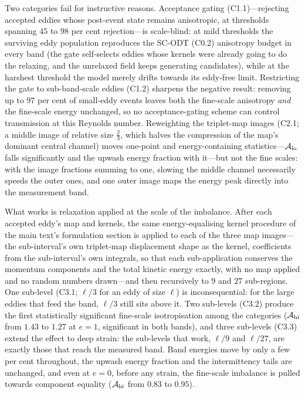\documentclass{JFM-FLM_Au}
\begin{document}
Two categories fail for instructive reasons. Acceptance gating
(C1.1)---rejecting accepted eddies whose post-event state remains
anisotropic, at thresholds spanning $45$ to $98$ per cent
rejection---is scale-blind: at mild thresholds the surviving eddy
population reproduces the SC-ODT (C0.2) anisotropy budget in every
band (the gate self-selects eddies whose kernels were already going to
do the relaxing, and the unrelaxed field keeps generating candidates),
while at the harshest threshold the model merely drifts towards its
eddy-free limit. Restricting the gate to sub-band-scale eddies (C1.2)
sharpens the negative result: removing up to $97$ per cent of
small-eddy events leaves both the fine-scale anisotropy \emph{and} the
fine-scale energy unchanged, so no acceptance-gating scheme can
control transmission at this Reynolds number. Reweighting the
triplet-map images (C2.1; a middle image of relative size $\tfrac23$,
which halves the compression of the map's dominant central channel)
moves one-point and energy-containing
statistics---$\mathcal A_{\rm lo}$ falls significantly and the upwash
energy fraction with it---but not the fine scales: with the image
fractions summing to one, slowing the middle channel necessarily
speeds the outer ones, and one outer image maps the energy peak
directly into the measurement band.

What works is relaxation applied at the scale of the imbalance. After
each accepted eddy's map and kernels, the same energy-equalising
kernel procedure of the main text's formulation section is applied to
each of the three map images---the sub-interval's own triplet-map
displacement shape as the kernel, coefficients from the sub-interval's
own integrals, so that each sub-application conserves the momentum
components and the total kinetic energy exactly, with no map applied
and no random numbers drawn---and then recursively to $9$ and $27$
sub-regions. One sub-level (C3.1; $\ell/3$ for an eddy of size $\ell$)
is inconsequential: for the large eddies that feed the band, $\ell/3$
still sits above it. Two sub-levels (C3.2) produce the first
statistically significant fine-scale isotropisation among the
categories ($\mathcal A_{\rm hi}$ from $1.43$ to $1.27$ at $e=1$,
significant in both bands), and three sub-levels (C3.3) extend the
effect to deep strain: the sub-levels that work, $\ell/9$ and
$\ell/27$, are exactly those that reach the measured band. Band
energies move by only a few per cent throughout, the upwash energy
fraction and the intermittency tails are unchanged, and even at $e=0$,
before any strain, the fine-scale imbalance is pulled towards
component equality ($\mathcal A_{\rm hi}$ from $0.83$ to $0.95$).
\end{document}
